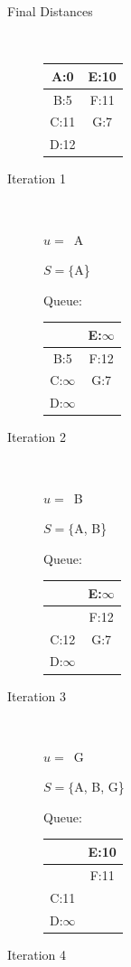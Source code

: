 \documentclass[12pt]{article}
\begin{document}
\begin{description}
\item [Final Distances]\ 

\begin{tabular}{|c|c|}\hline
A:0 & E:10\\\hline
B:5 & F:11\\\hline
C:11  & G:7\\\hline
D:12  & \\\hline
\end{tabular}
\item [Iteration 1]\ 

$u =$\ A

$S = \{$A\}

Queue:\\
\begin{tabular}{|c|c|}\hline
                & E:$\infty$\\\hline
    B:5         & F:12\\\hline
    C:$\infty$  & G:7\\\hline
    D:$\infty$  & \\\hline
\end{tabular}
\item [Iteration 2]\ 

$u =$\ B

$S = \{$A, B\}

Queue:\\
\begin{tabular}{|c|c|}\hline
                & E:$\infty$\\\hline
                & F:12\\\hline
    C:12        & G:7\\\hline
    D:$\infty$  & \\\hline
\end{tabular}

\item [Iteration 3]\ 

$u =$\ G

$S = \{$A, B, G\}

Queue:\\
\begin{tabular}{|c|c|}\hline
                & E:10\\\hline
                & F:11\\\hline
    C:11        & \\\hline
    D:$\infty$  & \\\hline
\end{tabular}
\item [Iteration 4]\ 


\end{description}
\end{document}
